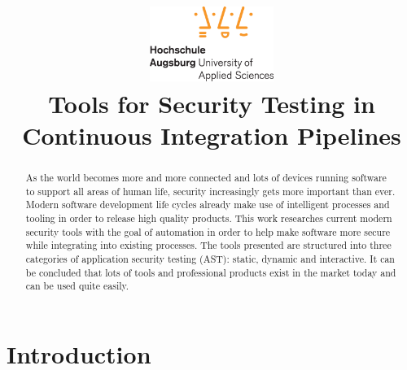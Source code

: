 \documentclass[conference]{IEEEtran}
\begin{document}
\title{
	\includegraphics[width=4cm]{fig/hsa_logo.eps}\\
	\vspace{0.6cm}
	Tools for Security Testing in Continuous Integration Pipelines}

\author{
}

\maketitle

\begin{abstract}
	
	As the world becomes more and more connected and lots of devices running software to support all areas of human life, security increasingly gets more important than ever. Modern software development life cycles already make use of intelligent processes and tooling in order to release high quality products. This work researches current modern security tools with the goal of automation in order to help make software more secure while integrating into existing processes. The tools presented are structured into three categories of application security testing (AST): static, dynamic and interactive. It can be concluded that lots of tools and professional products exist in the market today and can be used quite easily.
\end{abstract}


\section{Introduction}
\end{document}
